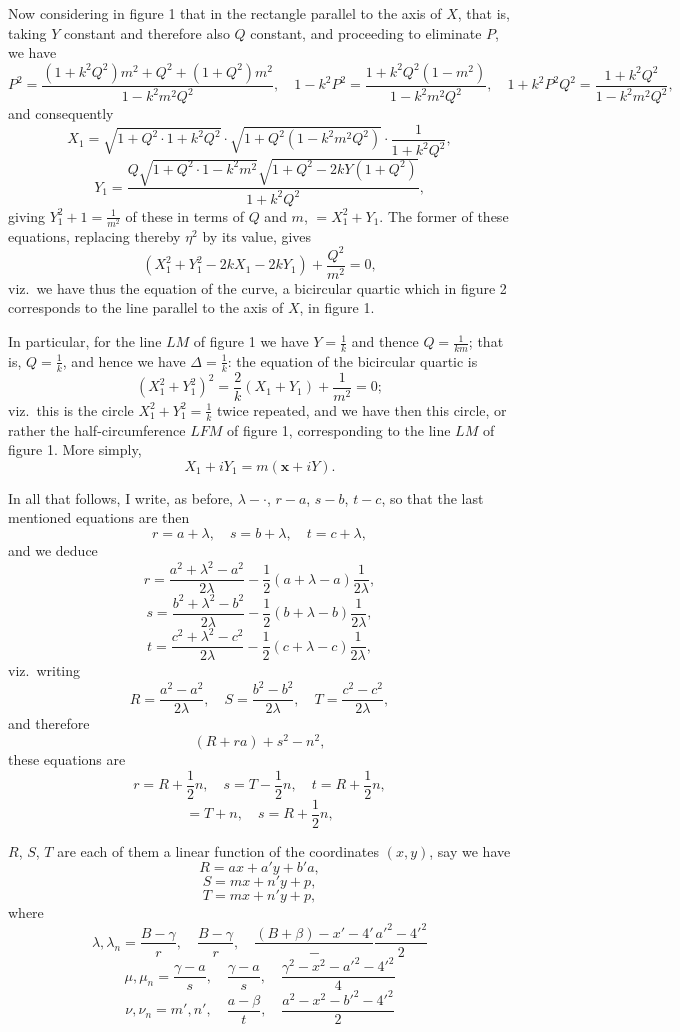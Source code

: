 \documentclass[11pt,a4paper]{article}
\begin{document}
Now considering in figure 1 that in the rectangle parallel to the axis of $X$, that is, taking $Y$ constant and therefore also $Q$ constant, and proceeding to eliminate $P$, we have
\[
P^2 = \frac{(1 + k^2 Q^2)m^2 + Q^2 + (1 + Q^2)m^2}{1 - k^2 m^2 Q^2}, \quad 1 - k^2 P^2 = \frac{1 + k^2 Q^2(1 - m^2)}{1 - k^2 m^2 Q^2}, \quad 1 + k^2 P^2 Q^2 = \frac{1 + k^2 Q^2}{1 - k^2 m^2 Q^2},
\]
and consequently
\[
X_1 = \sqrt{1 + Q^2 \cdot 1 + k^2 Q^2} \cdot \sqrt{1 + Q^2 (1 - k^2 m^2 Q^2)} \cdot \frac{1}{1 + k^2 Q^2},
\]
\[
Y_1 = \frac{Q \sqrt{1 + Q^2 \cdot 1 - k^2 m^2}\sqrt{1 + Q^2 - 2k Y(1 + Q^2)}}{1 + k^2 Q^2},
\]
giving $Y_1^2 + 1 = \frac{1}{m^2}$ of these in terms of $Q$ and $m$, $= X_1^2 + Y_1$. The former of these equations, replacing thereby $\eta^2$ by its value, gives
\[
(X_1^2 + Y_1^2 - 2k X_1 - 2k Y_1) + \frac{Q^2}{m^2} = 0,
\]
viz.\ we have thus the equation of the curve, a bicircular quartic which in figure 2 corresponds to the line parallel to the axis of $X$, in figure 1.

In particular, for the line $LM$ of figure 1 we have $Y = \frac{1}{k}$ and thence $Q = \frac{1}{km}$; that is, $Q = \frac{1}{k}$, and hence we have $\Delta = \frac{1}{k}$: the equation of the bicircular quartic is
\[
(X_1^2 + Y_1^2)^2 = \frac{2}{k} (X_1 + Y_1) + \frac{1}{m^2} = 0;
\]
viz.\ this is the circle $X_1^2 + Y_1^2 = \frac{1}{k}$ twice repeated, and we have then this circle, or rather the half-circumference $LFM$ of figure 1, corresponding to the line $LM$ of figure 1. More simply,
\[
X_1 + iY_1 = m(\boldsymbol{x} + iY).
\]

In all that follows, I write, as before, $\lambda - \cdot$, $r - a$, $s - b$, $t - c$, so that the last mentioned equations are then
\[
r = a + \lambda, \quad s = b + \lambda, \quad t = c + \lambda,
\]
and we deduce
\[
r = \frac{a^2 + \lambda^2 - a^2}{2\lambda} - \frac{1}{2}(a + \lambda - a)\frac{1}{2\lambda},
\]
\[
s = \frac{b^2 + \lambda^2 - b^2}{2\lambda} - \frac{1}{2}(b + \lambda - b)\frac{1}{2\lambda},
\]
\[
t = \frac{c^2 + \lambda^2 - c^2}{2\lambda} - \frac{1}{2}(c + \lambda - c)\frac{1}{2\lambda},
\]
viz.\ writing
\[
R = \frac{a^2 - a^2}{2\lambda}, \quad S = \frac{b^2 - b^2}{2\lambda}, \quad T = \frac{c^2 - c^2}{2\lambda},
\]
and therefore
\[
(R + ra) + s^2 - n^2,
\]
these equations are
\[
r = R + \frac{1}{2}n, \quad s = T - \frac{1}{2}n, \quad t = R + \frac{1}{2}n,
\]
\[
= T + n, \quad s = R + \frac{1}{2}n,
\]

$R$, $S$, $T$ are each of them a linear function of the coordinates $(x, y)$, say we have
\[
R = ax + a'y + b'a,
\]
\[
S = mx + n'y + p,
\]
\[
T = mx + n'y + p,
\]
where
\[
\lambda, \lambda_n = \frac{B - \gamma}{r}, \quad \frac{B - \gamma}{r}, \quad \frac{(B + \beta) - x' - 4'} - \frac{a'^2 - 4'^2}{2}
\]
\[
\mu, \mu_n = \frac{\gamma - a}{s}, \quad \frac{\gamma - a}{s}, \quad \frac{\gamma^2 - x^2 - a'^2 - 4'^2}{4}
\]
\[
\nu, \nu_n = m', n', \quad \frac{a - \beta}{t}, \quad \frac{a^2 - x^2 - b'^2 - 4'^2}{2}
\]
\end{document}
